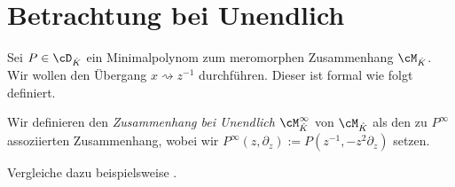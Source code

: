 \section{Betrachtung bei Unendlich}
Sei $P\in\cD_{\hat K}$ ein Minimalpolynom zum meromorphen Zusammenhang
$\cM_{\hat K}$.\\
Wir wollen den Übergang $x\rightsquigarrow z^{-1}$ durchführen. 
Dieser ist formal wie folgt definiert.
\begin{defn}
Wir definieren den \emph{Zusammenhang bei Unendlich $\cM_{\hat K}^\infty$} von
$\cM_{\hat K}$ als den zu $P^\infty$ assoziierten Zusammenhang, wobei wir
$P^\infty(z,\partial_z):=P(z^{-1},-z^2\partial_z)$ setzen.
\end{defn}

\begin{comment}
\[
\partial_x (f(\frac{1}{x}))=
\partial_z(f)\cdot (-\frac{1}{x^2})=
-\partial_z(f)\cdot z^2= %
- z^2 \cdot \partial_z(f)
\]
also $ \partial_x\rightsquigarrow-z^2\partial_z $, und somit erhalten wir
\[
P_\phi(x,\partial_x):=\cF_Q(x^{-1},-x^2\partial_x) \in \C[t]<\partial_t> \,.
\]
\end{comment}

Vergleiche dazu beispielsweise \cite[Seite 70 Exmp. 2]{sabbah_cimpa90}.

